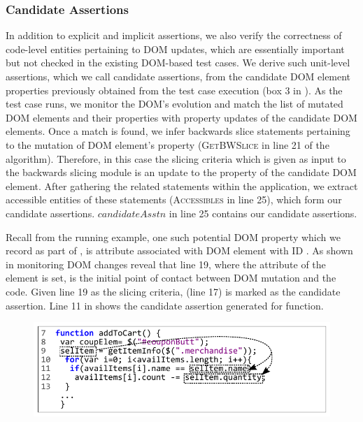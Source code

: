 \subsubsection{Candidate Assertions} \label{Sec:candidateAssertions}

In addition to explicit and implicit assertions, we also verify the correctness of code-level entities pertaining to DOM updates, which are essentially important but not checked in the existing DOM-based test cases. We derive such unit-level assertions, which we call candidate assertions, from the candidate DOM element properties previously obtained from the test case execution (box 3 in ). As the test case runs, we monitor the DOM's evolution and match the list of mutated DOM elements and their properties with property updates of the candidate DOM elements. Once a match is found, we infer backwards slice statements pertaining to the mutation of DOM element's property (\textsc{GetBWSlice} in line 21 of the algorithm). Therefore, in this case the slicing criteria which is given as input to the backwards slicing module is an update to the property of the candidate DOM element.
After gathering the related \javascript statements within the application, we extract accessible entities of these statements (\textsc{Accessibles} in line 25), which form our candidate assertions. $candidateAsstn$ in line 25 contains our candidate assertions. 

Recall from the running example, one such potential DOM property which we record as part of , is  attribute associated with DOM element with ID . As shown in  monitoring DOM changes reveal that line 19, where the  attribute of the element is set, is the initial point of contact between DOM mutation and the \javascript code. Given line 19 as the slicing criteria,  (line 17) is marked as the candidate assertion.
Line 11 in  shows the candidate assertion generated for  function. 

\begin{figure}[!t]
  \centering
  \includegraphics[width=1\hsize]{fig/forwardSlicingExample}
   \vspace{-0.3in} 
  \label{Fig:forwardSlicingExample}
  \vspace{-0.2in} 
\end{figure}

